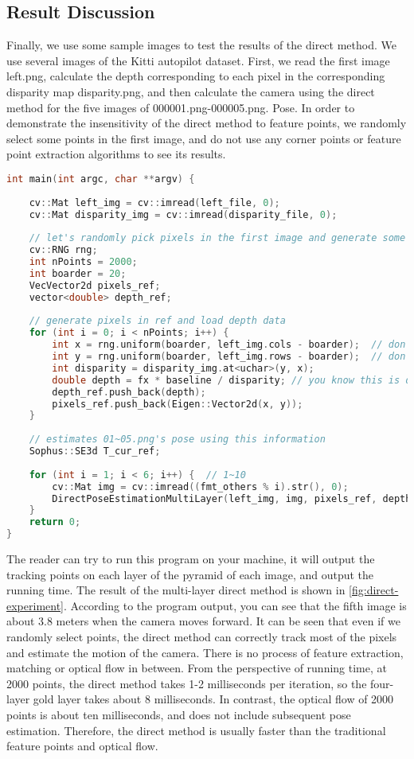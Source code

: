 \subsection{Result Discussion}
Finally, we use some sample images to test the results of the direct method. We use several images of the Kitti\textsubscript{\cite{Geiger2013}} autopilot dataset. First, we read the first image left.png, calculate the depth corresponding to each pixel in the corresponding disparity map disparity.png, and then calculate the camera using the direct method for the five images of 000001.png-000005.png. Pose. In order to demonstrate the insensitivity of the direct method to feature points, we randomly select some points in the first image, and do not use any corner points or feature point extraction algorithms to see its results.
\begin{lstlisting}[language=c++,caption=slambook2/ch8/direct_method.cpp（片段）]
int main(int argc, char **argv) {
	
	cv::Mat left_img = cv::imread(left_file, 0);
	cv::Mat disparity_img = cv::imread(disparity_file, 0);
	
	// let's randomly pick pixels in the first image and generate some 3d points in the first image's frame
	cv::RNG rng;
	int nPoints = 2000;
	int boarder = 20;
	VecVector2d pixels_ref;
	vector<double> depth_ref;
	
	// generate pixels in ref and load depth data
	for (int i = 0; i < nPoints; i++) {
		int x = rng.uniform(boarder, left_img.cols - boarder);  // don't pick pixels close to boarder
		int y = rng.uniform(boarder, left_img.rows - boarder);  // don't pick pixels close to boarder
		int disparity = disparity_img.at<uchar>(y, x);
		double depth = fx * baseline / disparity; // you know this is disparity to depth
		depth_ref.push_back(depth);
		pixels_ref.push_back(Eigen::Vector2d(x, y));
	}
	
	// estimates 01~05.png's pose using this information
	Sophus::SE3d T_cur_ref;
	
	for (int i = 1; i < 6; i++) {  // 1~10
		cv::Mat img = cv::imread((fmt_others % i).str(), 0);
		DirectPoseEstimationMultiLayer(left_img, img, pixels_ref, depth_ref, T_cur_ref);
	}
	return 0;
}
\end{lstlisting}

The reader can try to run this program on your machine, it will output the tracking points on each layer of the pyramid of each image, and output the running time. The result of the multi-layer direct method is shown in \autoref{fig:direct-experiment}. According to the program output, you can see that the fifth image is about 3.8 meters when the camera moves forward. It can be seen that even if we randomly select points, the direct method can correctly track most of the pixels and estimate the motion of the camera. There is no process of feature extraction, matching or optical flow in between. From the perspective of running time, at 2000 points, the direct method takes 1-2 milliseconds per iteration, so the four-layer gold layer takes about 8 milliseconds. In contrast, the optical flow of 2000 points is about ten milliseconds, and does not include subsequent pose estimation. Therefore, the direct method is usually faster than the traditional feature points and optical flow.

